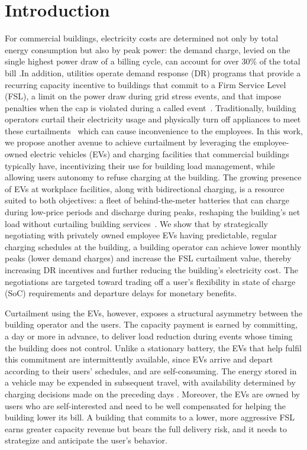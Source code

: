 \section{Introduction} 

For commercial buildings, electricity costs are determined not only by total energy consumption but also by peak power: the demand charge, levied on the single highest power draw of a billing cycle, can account for over 30\% of the total bill \cite{neufeld1987demandcharge,neubauer2014demandcharge}.In addition, utilities operate demand response (DR) programs that provide a recurring capacity incentive to buildings that commit to a Firm Service Level (FSL), a limit on the power draw during grid stress events, and that impose penalties when the cap is violated during a called event~\cite{}. Traditionally, building operators curtail their electricity usage and physically turn off appliances to meet these curtailments~\cite{} which can cause inconvenience to the employees. In this work, we propose another avenue to achieve curtailment by leveraging the employee-owned electric vehicles (EVs) and charging facilities that commercial buildings typically have, incentivizing their use for building load management, while allowing users autonomy to refuse charging at the building. The growing presence of EVs at workplace facilities, along with bidirectional charging, is a resource suited to both objectives: a fleet of behind-the-meter batteries that can charge during low-price periods and discharge during peaks, reshaping the building's net load without curtailing building services~\cite{}. We show that by strategically negotiating with privately owned employee EVs having predictable, regular charging schedules at the building, a building operator can achieve lower monthly peaks (lower demand charges) and increase the FSL curtailment value, thereby increasing DR incentives and further reducing the building's electricity cost. The negotiations are targeted toward trading off a user's flexibility in state of charge (SoC) requirements and departure delays for monetary benefits.

Curtailment using the EVs, however, exposes a structural asymmetry between the building operator and the users. The capacity payment is earned by committing, a day or more in advance, to deliver load reduction during events whose timing the building does not control. Unlike a stationary battery, the EVs that help fulfil this commitment are intermittently available, since EVs arrive and depart according to their users' schedules, and are self-consuming. The energy stored in a vehicle may be expended in subsequent travel, with availability determined by charging decisions made on the preceding days \cite{iccps2026_pv2b}. Moreover, the EVs are owned by users who are self-interested and need to be well compensated for helping the building lower its bill. A building that commits to a lower, more aggressive FSL earns greater capacity revenue but bears the full delivery risk, and it needs to strategize and anticipate the user's behavior.
 

